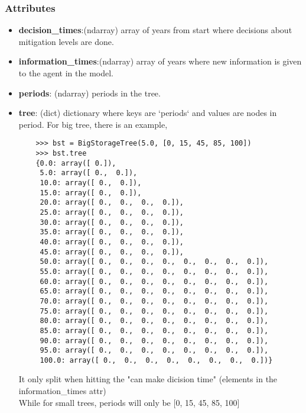 \documentclass[12pt]{article}
\begin{document}
\subsubsection{Attributes}
\begin{itemize}
\item \textbf{decision\_times}:(ndarray) array of years from start where decisions about mitigation levels are done.
\item \textbf{information\_times}:(ndarray) array of years where new information is given to the agent in the model.
\item \textbf{periods}: (ndarray) 	periods in the tree.
\item \textbf{tree}: (dict) dictionary where keys are `periods` and values are nodes in period. For big tree, there is an example,
\begin{verbatim}
    >>> bst = BigStorageTree(5.0, [0, 15, 45, 85, 100])
    >>> bst.tree
    {0.0: array([ 0.]),
     5.0: array([ 0.,  0.]),
     10.0: array([ 0.,  0.]),
     15.0: array([ 0.,  0.]),
     20.0: array([ 0.,  0.,  0.,  0.]),
     25.0: array([ 0.,  0.,  0.,  0.]),
     30.0: array([ 0.,  0.,  0.,  0.]),
     35.0: array([ 0.,  0.,  0.,  0.]),
     40.0: array([ 0.,  0.,  0.,  0.]),
     45.0: array([ 0.,  0.,  0.,  0.]),
     50.0: array([ 0.,  0.,  0.,  0.,  0.,  0.,  0.,  0.]),
     55.0: array([ 0.,  0.,  0.,  0.,  0.,  0.,  0.,  0.]),
     60.0: array([ 0.,  0.,  0.,  0.,  0.,  0.,  0.,  0.]),
     65.0: array([ 0.,  0.,  0.,  0.,  0.,  0.,  0.,  0.]),
     70.0: array([ 0.,  0.,  0.,  0.,  0.,  0.,  0.,  0.]),
     75.0: array([ 0.,  0.,  0.,  0.,  0.,  0.,  0.,  0.]),
     80.0: array([ 0.,  0.,  0.,  0.,  0.,  0.,  0.,  0.]),
     85.0: array([ 0.,  0.,  0.,  0.,  0.,  0.,  0.,  0.]),
     90.0: array([ 0.,  0.,  0.,  0.,  0.,  0.,  0.,  0.]),
     95.0: array([ 0.,  0.,  0.,  0.,  0.,  0.,  0.,  0.]),
     100.0: array([ 0.,  0.,  0.,  0.,  0.,  0.,  0.,  0.])}
\end{verbatim}
    It only split when hitting the "can make dicision time" (elements in the information\_times attr)\\
    While for small trees, periods will only be [0, 15, 45, 85, 100]
\end{itemize}
\end{document}
